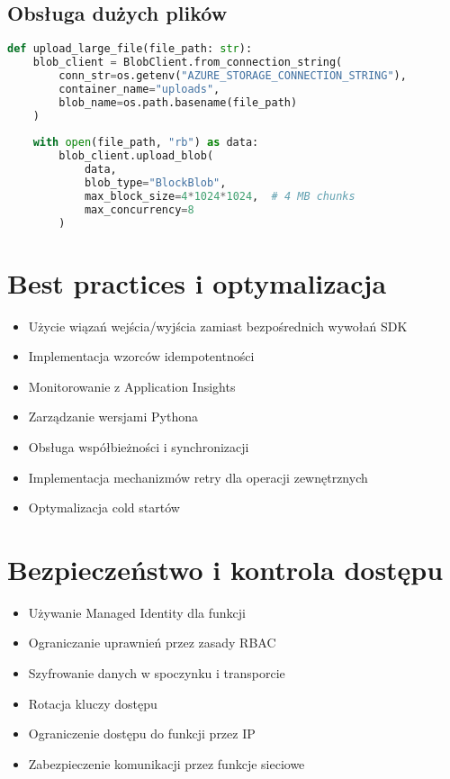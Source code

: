 \documentclass{article}
\begin{document}
\subsection{Obsługa dużych plików}
\begin{lstlisting}[language=python]
def upload_large_file(file_path: str):
    blob_client = BlobClient.from_connection_string(
        conn_str=os.getenv("AZURE_STORAGE_CONNECTION_STRING"),
        container_name="uploads",
        blob_name=os.path.basename(file_path)
    )
    
    with open(file_path, "rb") as data:
        blob_client.upload_blob(
            data,
            blob_type="BlockBlob",
            max_block_size=4*1024*1024,  # 4 MB chunks
            max_concurrency=8
        )
\end{lstlisting}

\section{Best practices i optymalizacja}
\begin{itemize}
\item Użycie wiązań wejścia/wyjścia zamiast bezpośrednich wywołań SDK
\item Implementacja wzorców idempotentności
\item Monitorowanie z Application Insights
\item Zarządzanie wersjami Pythona
\item Obsługa współbieżności i synchronizacji
\item Implementacja mechanizmów retry dla operacji zewnętrznych
\item Optymalizacja cold startów
\end{itemize}

\section{Bezpieczeństwo i kontrola dostępu}
\begin{itemize}
\item Używanie Managed Identity dla funkcji
\item Ograniczanie uprawnień przez zasady RBAC
\item Szyfrowanie danych w spoczynku i transporcie
\item Rotacja kluczy dostępu
\item Ograniczenie dostępu do funkcji przez IP
\item Zabezpieczenie komunikacji przez funkcje sieciowe
\end{itemize}
\end{document}
